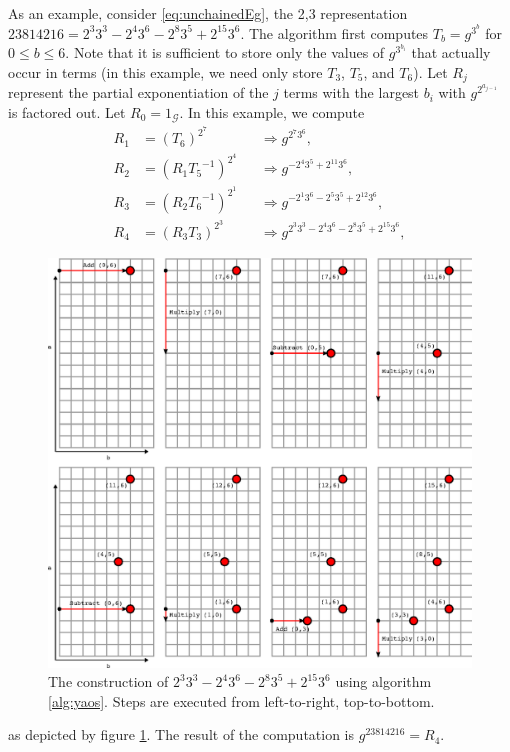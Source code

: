 \documentclass{ucalgthes1}
\theoremstyle{plain}
\theoremstyle{definition}
\begin{document}
As an example, consider \eqref{eq:unchainedEg}, the 2,3 representation $23814216 = 2^3 3^3 - 2^4 3^6 - 2^8 3^5 + 2^{15} 3^6$.  The algorithm first computes $T_b = g^{3^b}$ for $0 \le b \le 6$.  Note that it is sufficient to store only the values of $g^{3^{b_i}}$ that actually occur in terms (in this example, we need only store $T_3$, $T_5$, and $T_6$).  Let $R_j$ represent the partial exponentiation of the $j$ terms with the largest $b_i$ with $g^{2^{a_{j-1}}}$ is factored out.  Let $R_0 = 1_{\mathcal G}$.  In this example, we compute 
\begin{align*}
	R_1 &= \left( T_6 \right)^{2^7} &&\Rightarrow g^{2^7 3^6}, \\
	R_2 &= \left( R_1 {T_5}^{-1} \right)^{2^4} &&\Rightarrow g^{-2^4 3^5 + 2^{11} 3^6}, \\
	R_3 &= \left( R_2 {T_6}^{-1} \right)^{2^1} &&\Rightarrow g^{-2^1 3^6 -2^5 3^5 + 2^{12} 3^6}, \\
	R_4 &= \left( R_3 T_3 \right) ^ {2^3} &&\Rightarrow g^{2^3 3^3 -2^4 3^6 -2^8 3^5 + 2^{15} 3^6},
\end{align*}
\begin{figure}[H]
\centering
\includegraphics{yao1}
\caption{The construction of $2^3 3^3 - 2^4 3^6 - 2^8 3^5 + 2^{15} 3^6$ using algorithm \ref{alg:yaos}.  Steps are executed from left-to-right, top-to-bottom.}
\label{fig:yao1}
\end{figure}
as depicted by figure \ref{fig:yao1}.  The result of the computation is $g^{23814216} = R_4$.  
\end{document}
